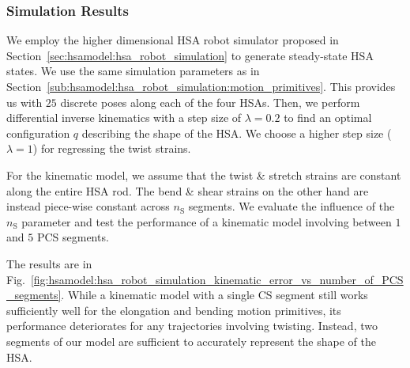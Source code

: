 
\subsubsection{Simulation Results}\label{ssub:hsamodel:hsa_rod_kinematics:simulation_results}
%
We employ the higher dimensional \gls{HSA} robot simulator proposed in Section~\ref{sec:hsamodel:hsa_robot_simulation} to generate steady-state \gls{HSA} states. We use the same simulation parameters as in Section~\ref{sub:hsamodel:hsa_robot_simulation:motion_primitives}. This provides us with $25$ discrete poses along each of the four \glspl{HSA}.
Then, we perform differential inverse kinematics with a step size of $\lambda = 0.2$ to find an optimal configuration $q$ describing the shape of the \gls{HSA}. We choose a higher step size ($\lambda=1$) for regressing the twist strains.

For the kinematic model, we assume that the twist \& stretch strains are constant along the entire \gls{HSA} rod. The bend \& shear strains on the other hand are instead piece-wise constant across $n_\mathrm{S}$ segments. We evaluate the influence of the $n_\mathrm{S}$ parameter and test the performance of a kinematic model involving between $1$ and $5$ \gls{PCS} segments.

The results are in Fig.~\ref{fig:hsamodel:hsa_robot_simulation_kinematic_error_vs_number_of_PCS_segments}. While a kinematic model with a single \gls{CS} segment still works sufficiently well for the elongation and bending motion primitives, its performance deteriorates for any trajectories involving twisting. Instead, two segments of our model are sufficient to accurately represent the shape of the \gls{HSA}. 


